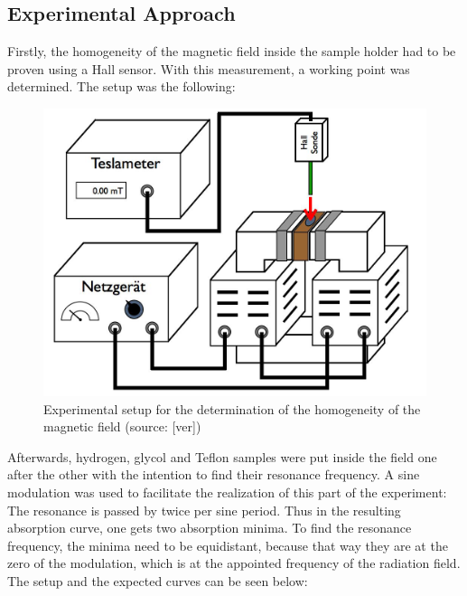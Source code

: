 \subsection{Experimental Approach}
Firstly, the homogeneity of the magnetic field inside the sample holder had to be proven using a Hall sensor. With this measurement, a working point was determined. The setup was the following:\\
\begin{figure}[htbp]
\begin{center}
\includegraphics [scale=0.5]{Bilder/hallsonde.png}
\caption{Experimental setup for the determination of the homogeneity of the magnetic field (source: [ver])}
\end{center}
\end{figure}
\clearpage
Afterwards, hydrogen, glycol and Teflon samples were put inside the field one after the other with the intention to find their resonance frequency. A sine modulation was used to facilitate the realization of this part of the experiment: The resonance is passed by twice per sine period. Thus in the resulting absorption curve, one gets two absorption minima. To find the resonance frequency, the minima need to be equidistant, because that way they are at the zero of the modulation, which is at the appointed frequency of the radiation field. The setup and the expected curves can be seen below:\\
